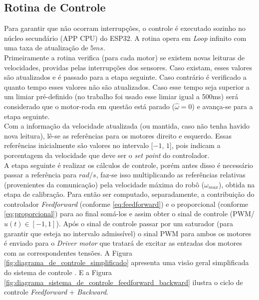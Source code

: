 \subsection{Rotina de Controle}
\label{subsec:rotina_controle}
Para garantir que não ocorram interrupções, o controle é executado sozinho no núcleo secundário (APP CPU) do ESP32. A rotina opera em \emph{Loop} infinito com uma taxa de atualização de $5ms$.\\

Primeiramente a rotina verifica (para cada motor) se existem novas leituras de velocidades, providas pelas interrupções dos sensores. Caso existam, esses valores são atualizados e é passado para a etapa seguinte. Caso contrário é verificado a quanto tempo esses valores não são atualizados. Caso esse tempo seja superior a um limiar pré-definido (no trabalho foi usado esse limiar igual a 500ms) será considerado que o motor-roda em questão está parado ($\hat{\omega} = 0$) e avança-se para a etapa seguinte.\\

Com a informação da velocidade atualizada (ou mantida, caso não tenha havido nova leitura), lê-se as referências para os motores direito e esquerdo. Essas referências inicialmente são valores no intervalo [$-1$, $1$], pois indicam a porcentagem da velocidade que deve ser o \emph{set point} do controlador. \\

A etapa seguinte é realizar os cálculos de controle, porém antes disso é necessário passar a referência para $rad/s$, faz-se isso multiplicando as referências relativas (provenientes da comunicação) pela velocidade máxima do robô ($\omega_{max}$), obtida na etapa de calibração. Para então ser computado, separadamente, a contribuição do controlador \emph{Feedforward} (conforme \ref{eq:feedforward}) e o proporcional (conforme \ref{eq:proporcional}) para ao final somá-los e assim obter o sinal de controle (PWM/$u(t) \in [-1,1]$). Após o sinal de controle passar por um saturador (para garantir que esteja no intervalo admissível) o sinal PWM para ambos os motores é enviado para o \emph{Driver motor} que tratará de excitar as entradas dos motores com as correspondentes tensões. A Figura \ref{fig:diagrama_de_controle_simplificado} apresenta uma visão geral simplificada do sistema de controle . E a Figura \ref{fig:diagrama_sistema_de_controle_feedforward_backward} ilustra o ciclo de controle \emph{Feedforward} + \emph{Backward}.

